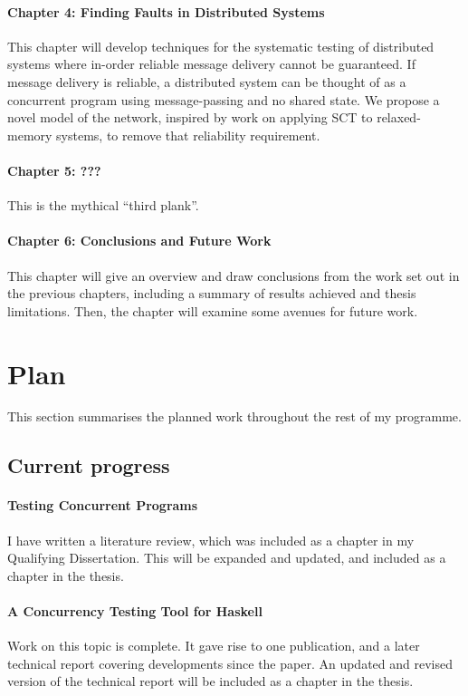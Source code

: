 \documentclass{article}
\begin{document}
\paragraph{Chapter 4: Finding Faults in Distributed Systems} This
chapter will develop techniques for the systematic testing of
distributed systems where in-order reliable message delivery cannot be
guaranteed. If message delivery is reliable, a distributed system can
be thought of as a concurrent program using message-passing and no
shared state. We propose a novel model of the network, inspired by
work on applying SCT to relaxed-memory systems\cite{zhang2015}, to
remove that reliability requirement.

\paragraph{Chapter 5: ???} This is the mythical ``third plank''.

\paragraph{Chapter 6: Conclusions and Future Work} This chapter will
give an overview and draw conclusions from the work set out in the
previous chapters, including a summary of results achieved and thesis
limitations. Then, the chapter will examine some avenues for future
work.

\section{Plan}

This section summarises the planned work throughout the rest of my
programme.

\subsection{Current progress}

\paragraph{Testing Concurrent Programs} I have written a literature
review, which was included as a chapter in my Qualifying Dissertation.
This will be expanded and updated, and included as a chapter in the
thesis.

\paragraph{A Concurrency Testing Tool for Haskell} Work on this topic
is complete. It gave rise to one publication\cite{walker2015}, and a
later technical report\cite{YCS-2016-503} covering developments since
the paper. An updated and revised version of the technical report will
be included as a chapter in the thesis.
\end{document}
